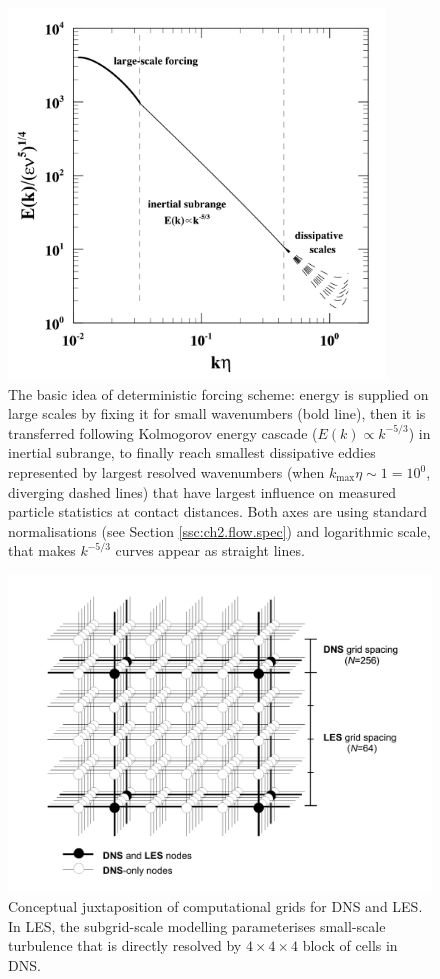 \begin{figure}
\centering
\includegraphics[width=10cm]{figures/1-01_forcing.pdf}
\caption{
The basic idea of deterministic forcing scheme: energy is supplied on large scales by fixing it for small wavenumbers (bold line), then it is transferred following Kolmogorov energy cascade ($E(k) \propto k^{-5/3}$) in inertial subrange, to finally reach smallest dissipative eddies represented by largest resolved wavenumbers (when $k_{\max} \eta \sim 1 = 10^0$, diverging dashed lines) that have largest influence on measured particle statistics at contact distances.
Both axes are using standard normalisations (see Section \ref{ssc:ch2.flow.spec}) and logarithmic scale, that makes $k^{-5/3}$ curves appear as straight lines.}
\label{fig:forcing}
\end{figure}


\begin{figure}
\centering
\includegraphics[width=17cm]{figures/1-02_dns-les-grids.pdf}
\caption{
Conceptual juxtaposition of computational grids for DNS and LES.
In LES, the subgrid-scale modelling parameterises small-scale turbulence that is directly resolved by $4 \times 4 \times 4$ block of cells in DNS.
}
\label{fig:dns-les-grids}
\end{figure}


